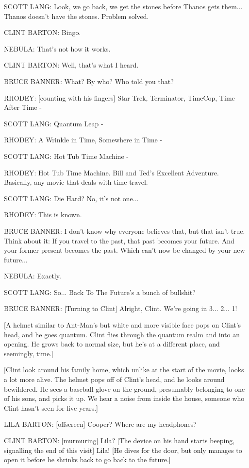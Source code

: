 SCOTT LANG: Look, we go back, we get the stones before Thanos gets them... Thanos doesn't have the stones. Problem solved.

CLINT BARTON: Bingo.

NEBULA: That's not how it works.

CLINT BARTON: Well, that's what I heard.

BRUCE BANNER: What? By who? Who told you that?

RHODEY: [counting with his fingers] Star Trek, Terminator, TimeCop, Time After Time -

SCOTT LANG: Quantum Leap -

RHODEY: A Wrinkle in Time, Somewhere in Time -

SCOTT LANG: Hot Tub Time Machine -

RHODEY: Hot Tub Time Machine. Bill and Ted's Excellent Adventure. Basically, any movie that deals with time travel.

SCOTT LANG: Die Hard? No, it's not one...

RHODEY: This is known.

BRUCE BANNER: I don't know why everyone believes that, but that isn't true. Think about it: If you travel to the past, that past becomes your future. And your former present becomes the past. Which can't now be changed by your new future...

NEBULA: Exactly.

SCOTT LANG: So... Back To The Future's a bunch of bullshit?

BRUCE BANNER: [Turning to Clint] Alright, Clint. We're going in 3... 2... 1!

[A helmet similar to Ant-Man's but white and more visible face pops on Clint's head, and he goes quantum. Clint flies through the quantum realm and into an opening. He grows back to normal size, but he's at a different place, and seemingly, time.]

[Clint look around his family home, which unlike at the start of the movie, looks a lot more alive. The helmet pops off of Clint's head, and he looks around bewildered. He sees a baseball glove on the ground, presumably belonging to one of his sons, and picks it up. We hear a noise from inside the house, someone who Clint hasn't seen for five years.]

LILA BARTON: [offscreen] Cooper? Where are my headphones?

CLINT BARTON: [murmuring] Lila? [The device on his hand starts beeping, signalling the end of this visit] Lila! [He dives for the door, but only manages to open it before he shrinks back to go back to the future.]

